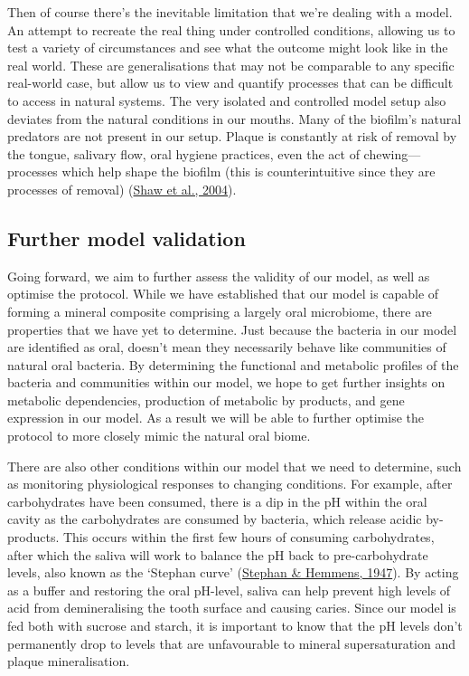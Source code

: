 \documentclass[
  b5paper,
]{book}
\begin{document}
Then of course there's the inevitable limitation that we're dealing with
a model. An attempt to recreate the real thing under controlled
conditions, allowing us to test a variety of circumstances and see what
the outcome might look like in the real world. These are generalisations
that may not be comparable to any specific real-world case, but allow us
to view and quantify processes that can be difficult to access in
natural systems. The very isolated and controlled model setup also
deviates from the natural conditions in our mouths. Many of the
biofilm's natural predators are not present in our setup. Plaque is
constantly at risk of removal by the tongue, salivary flow, oral hygiene
practices, even the act of chewing---processes which help shape the
biofilm (this is counterintuitive since they are processes of removal)
(\protect\hyperlink{ref-shawCommonalityElastic2004}{Shaw et al., 2004}).

\hypertarget{further-model-validation}{%
\subsection{Further model validation}\label{further-model-validation}}

Going forward, we aim to further assess the validity of our model, as
well as optimise the protocol. While we have established that our model
is capable of forming a mineral composite comprising a largely oral
microbiome, there are properties that we have yet to determine. Just
because the bacteria in our model are identified as oral, doesn't mean
they necessarily behave like communities of natural oral bacteria. By
determining the functional and metabolic profiles of the bacteria and
communities within our model, we hope to get further insights on
metabolic dependencies, production of metabolic by products, and gene
expression in our model. As a result we will be able to further optimise
the protocol to more closely mimic the natural oral biome.

There are also other conditions within our model that we need to
determine, such as monitoring physiological responses to changing
conditions. For example, after carbohydrates have been consumed, there
is a dip in the pH within the oral cavity as the carbohydrates are
consumed by bacteria, which release acidic by-products. This occurs
within the first few hours of consuming carbohydrates, after which the
saliva will work to balance the pH back to pre-carbohydrate levels, also
known as the `Stephan curve'
(\protect\hyperlink{ref-stephanStudiesChanges1947}{Stephan \& Hemmens,
1947}). By acting as a buffer and restoring the oral pH-level, saliva
can help prevent high levels of acid from demineralising the tooth
surface and causing caries. Since our model is fed both with sucrose and
starch, it is important to know that the pH levels don't permanently
drop to levels that are unfavourable to mineral supersaturation and
plaque mineralisation.
\end{document}
